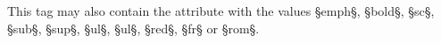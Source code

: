 \eins \quad This tag may also contain the  attribute with the values §emph§, §bold§, §sc§, §sub§, §sup§, §ul§, §ul§, §red§, §fr§ or §rom§.






